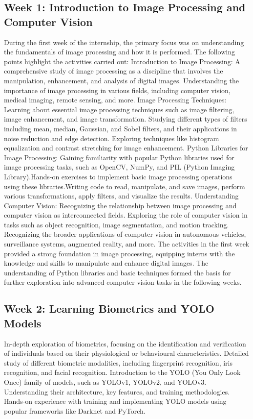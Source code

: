\documentclass{article}
\begin{document}
\subsection{Week 1: Introduction to Image Processing and Computer Vision}
During the first week of the internship, the primary focus was on understanding the fundamentals of image processing and how it is performed. The following points highlight the activities carried out:
Introduction to Image Processing:
A comprehensive study of image processing as a discipline that involves the manipulation, enhancement, and analysis of digital images.
Understanding the importance of image processing in various fields, including computer vision, medical imaging, remote sensing, and more.
Image Processing Techniques: Learning about essential image processing techniques such as image filtering, image enhancement, and image transformation.
Studying different types of filters including mean, median, Gaussian, and Sobel filters, and their applications in noise reduction and edge detection.
Exploring techniques like histogram equalization and contrast stretching for image enhancement.
Python Libraries for Image Processing:
Gaining familiarity with popular Python libraries used for image processing tasks, such as OpenCV, NumPy, and PIL (Python Imaging Library).Hands-on exercises to implement basic image processing operations using these libraries.Writing code to read, manipulate, and save images, perform various transformations, apply filters, and visualize the results.
Understanding Computer Vision:
Recognizing the relationship between image processing and computer vision as interconnected fields.
Exploring the role of computer vision in tasks such as object recognition, image segmentation, and motion tracking.
Recognizing the broader applications of computer vision in autonomous vehicles, surveillance systems, augmented reality, and more.
The activities in the first week provided a strong foundation in image processing, equipping interns with the knowledge and skills to manipulate and enhance digital images. The understanding of Python libraries and basic techniques formed the basis for further exploration into advanced computer vision tasks in the following weeks.

\subsection{Week 2: Learning Biometrics and YOLO Models}
In-depth exploration of biometrics, focusing on the identification and verification of individuals based on their physiological or behavioural characteristics.
Detailed study of different biometric modalities, including fingerprint recognition, iris recognition, and facial recognition.
Introduction to the YOLO (You Only Look Once) family of models, such as YOLOv1, YOLOv2, and YOLOv3. Understanding their architecture, key features, and training methodologies.
Hands-on experience with training and implementing YOLO models using popular frameworks like Darknet and PyTorch.
\end{document}
